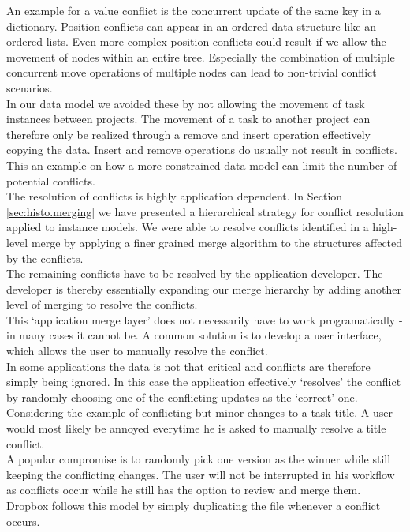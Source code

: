 An example for a value conflict is the concurrent update of the same key in a dictionary.
Position conflicts can appear in an ordered data structure like an ordered lists.
Even more complex position conflicts could result if we allow the movement of nodes within an entire tree.
Especially the combination of multiple concurrent move operations of multiple nodes can lead to non-trivial conflict scenarios.\\
In our data model we avoided these by not allowing the movement of task instances between projects.
The movement of a task to another project can therefore only be realized through a remove and insert operation effectively copying the data.
Insert and remove operations do usually not result in conflicts.
This an example on how a more constrained data model can limit the number of potential conflicts.\\
The resolution of conflicts is highly application dependent.
In Section \ref{sec:histo.merging} we have presented a hierarchical strategy for conflict resolution applied to instance models.
We were able to resolve conflicts identified in a high-level merge by applying a finer grained merge algorithm to the structures affected by the conflicts.\\
The remaining conflicts have to be resolved by the application developer.
The developer is thereby essentially expanding our merge hierarchy by adding another level of merging to resolve the conflicts.\\
This `application merge layer' does not necessarily have to work programatically - in many cases it cannot be.
A common solution is to develop a user interface, which allows the user to manually resolve the conflict.\\
In some applications the data is not that critical and conflicts are therefore simply being ignored.
In this case the application effectively `resolves' the conflict by randomly choosing one of the conflicting updates as the `correct' one.\\
Considering the example of conflicting but minor changes to a task title.
A user would most likely be annoyed everytime he is asked to manually resolve a title conflict.\\
A popular compromise is to randomly pick one version as the winner while still keeping the conflicting changes.
The user will not be interrupted in his workflow as conflicts occur while he still has the option to review and merge them.\\
Dropbox \cite{dropbox} follows this model by simply duplicating the file whenever a conflict occurs.
